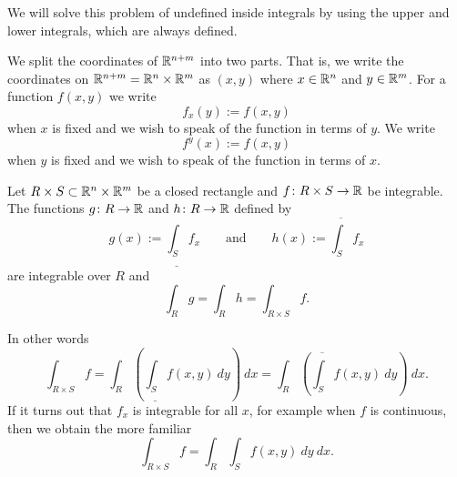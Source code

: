 We will solve this problem of undefined inside integrals
by using the upper and lower integrals, which are always defined.

\medskip

We split the coordinates of ${\mathbb{R}}^{n+m}$ into two parts.  That is,
we write the coordinates on ${\mathbb{R}}^{n+m} = {\mathbb{R}}^n \times {\mathbb{R}}^m$ as
$(x,y)$ where $x \in {\mathbb{R}}^n$ and $y \in {\mathbb{R}}^m$.  For a function $f(x,y)$
we write
\begin{equation*}
f_x(y) := f(x,y)
\end{equation*}
when $x$ is fixed and we wish to speak of the function in terms of $y$.
We write
\begin{equation*}
f^y(x) := f(x,y)
\end{equation*}
when $y$ is fixed and we wish to speak of the function in terms of $x$.

\begin{thm} \label{mv:fubinivA}
Let $R \times S \subset {\mathbb{R}}^n \times {\mathbb{R}}^m$ be a closed rectangle and
$f \colon R \times S \to {\mathbb{R}}$ be integrable.
The functions $g \colon R \to {\mathbb{R}}$ and $h \colon R \to {\mathbb{R}}$ defined by
\begin{equation*}
g(x) := \underline{\int_S} f_x \qquad
\text{and} \qquad
h(x) := \overline{\int_S} f_x 
\end{equation*}
are integrable over $R$ and
\begin{equation*}
\int_R g = \int_R h = \int_{R \times S} f .
\end{equation*}
\end{thm}

In other words
\begin{equation*}
\int_{R \times S} f
=
 \int_R \left(
 \underline{\int_S} f(x,y) ~ dy
\right) ~ dx
=
 \int_R \left(
 \overline{\int_S} f(x,y) ~ dy
\right) ~ dx .
\end{equation*}
If it turns out that $f_x$ is integrable for all $x$, for example when
$f$ is continuous, then we obtain the more familiar
\begin{equation*}
\int_{R \times S} f
=
 \int_R \int_S f(x,y) ~ dy ~ dx .
\end{equation*}

